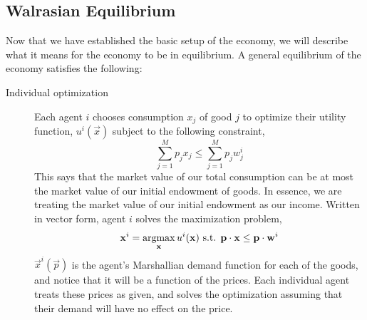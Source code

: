 \subsection*{Walrasian Equilibrium}
Now that we have established the basic setup of the economy, we will describe what it means for the economy to be in equilibrium. A general equilibrium of the economy satisfies the following: 
\begin{description}
    \item[Individual optimization] Each agent $i$ chooses consumption $x_j$ of good $j$ to optimize their utility function, $u^i(\vec{x})$ subject to the following constraint,
    \begin{equation} \label{eq:ge_budget_constraint}
        \sum_{j = 1}^M p_j x_j \leq \sum_{j = 1}^M p_j w^i_j 
    \end{equation} 
    This says that the market value of our total consumption can be at most the market value of our initial endowment of goods. In essence, we are treating the market value of our initial endowment as our income. Written in vector form, agent $i$ solves the maximization problem,
    \begin{align*}
        \mathbf{x}^i = \operatorname*{arg max}_{\mathbf{x}}u^i(\mathbf{x}) \text{ s.t. } \mathbf{p} \cdot \mathbf{x} \leq \mathbf{p} \cdot \mathbf{w}^i
    \end{align*}
    $\vec{x}^i(\vec{p})$ is the agent's Marshallian demand function for each of the goods, and notice that it will be a function of the prices. Each individual agent treats these prices as given, and solves the optimization assuming that their demand will have no effect on the price. 


\end{description}
